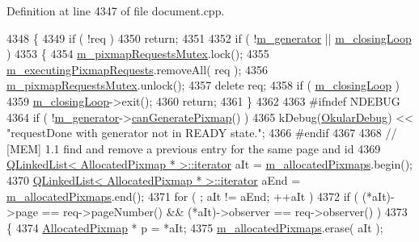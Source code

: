 Definition at line 4347 of file document.\+cpp.


\begin{DoxyCode}
4348 \{
4349     \textcolor{keywordflow}{if} ( !req )
4350         \textcolor{keywordflow}{return};
4351 
4352     \textcolor{keywordflow}{if} ( !\hyperlink{classOkular_1_1DocumentPrivate_a52083f79ce95756ddea060e74315e91f}{m\_generator} || \hyperlink{classOkular_1_1DocumentPrivate_a836cb1b614d8d25bad8403dfd746ef00}{m\_closingLoop} )
4353     \{
4354         \hyperlink{classOkular_1_1DocumentPrivate_a5c0e919d575a7a3c19a42c64a672fce4}{m\_pixmapRequestsMutex}.lock();
4355         \hyperlink{classOkular_1_1DocumentPrivate_adc84c2f8f76e7880b41e155edabf69e7}{m\_executingPixmapRequests}.removeAll( req );
4356         \hyperlink{classOkular_1_1DocumentPrivate_a5c0e919d575a7a3c19a42c64a672fce4}{m\_pixmapRequestsMutex}.unlock();
4357         \textcolor{keyword}{delete} req;
4358         \textcolor{keywordflow}{if} ( \hyperlink{classOkular_1_1DocumentPrivate_a836cb1b614d8d25bad8403dfd746ef00}{m\_closingLoop} )
4359             \hyperlink{classOkular_1_1DocumentPrivate_a836cb1b614d8d25bad8403dfd746ef00}{m\_closingLoop}->exit();
4360         \textcolor{keywordflow}{return};
4361     \}
4362 
4363 \textcolor{preprocessor}{#ifndef NDEBUG}
4364     \textcolor{keywordflow}{if} ( !\hyperlink{classOkular_1_1DocumentPrivate_a52083f79ce95756ddea060e74315e91f}{m\_generator}->\hyperlink{classOkular_1_1Generator_abbf00927221e2d2b2b71101f2b7f5732}{canGeneratePixmap}() )
4365         kDebug(\hyperlink{debug__p_8h_af16c6e32a95969dd0605d792ec9807c7}{OkularDebug}) << \textcolor{stringliteral}{"requestDone with generator not in READY state."};
4366 \textcolor{preprocessor}{#endif}
4367 
4368     \textcolor{comment}{// [MEM] 1.1 find and remove a previous entry for the same page and id}
4369     \hyperlink{classQLinkedList}{QLinkedList< AllocatedPixmap * >::iterator} aIt = 
      \hyperlink{classOkular_1_1DocumentPrivate_a13e55dcfc91cfbe1ff91a55312f3e39f}{m\_allocatedPixmaps}.begin();
4370     \hyperlink{classQLinkedList}{QLinkedList< AllocatedPixmap * >::iterator} aEnd = 
      \hyperlink{classOkular_1_1DocumentPrivate_a13e55dcfc91cfbe1ff91a55312f3e39f}{m\_allocatedPixmaps}.end();
4371     \textcolor{keywordflow}{for} ( ; aIt != aEnd; ++aIt )
4372         \textcolor{keywordflow}{if} ( (*aIt)->page == req->pageNumber() && (*aIt)->observer == req->observer() )
4373         \{
4374             \hyperlink{structAllocatedPixmap}{AllocatedPixmap} * p = *aIt;
4375             \hyperlink{classOkular_1_1DocumentPrivate_a13e55dcfc91cfbe1ff91a55312f3e39f}{m\_allocatedPixmaps}.erase( aIt );

\end{DoxyCode}
